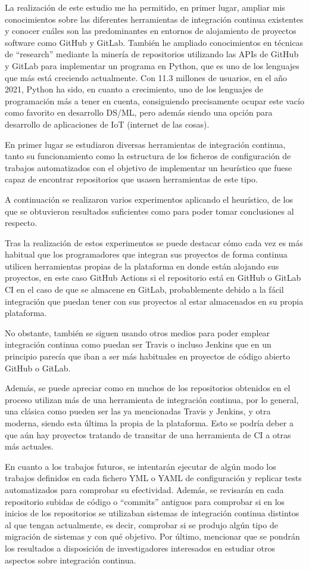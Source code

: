 La realización de este estudio me ha permitido, en primer lugar, ampliar mis conocimientos sobre las diferentes herramientas de integración continua existentes y conocer cuáles son las predominantes en entornos de alojamiento de proyectos software como GitHub y GitLab.
También he ampliado conocimientos en técnicas de ``research'' mediante la minería de repositorios utilizando las APIs de GitHub y GitLab para implementar un programa en Python, que es uno de los lenguajes que más está creciendo actualmente. 
Con 11.3 millones de usuarios, en el año 2021, Python ha sido, en cuanto a crecimiento, uno de los lenguajes de programación más a tener en cuenta, consiguiendo precisamente ocupar este vacío como favorito en desarrollo DS/ML, pero además siendo una opción para desarrollo de aplicaciones de IoT (internet de las cosas).

En primer lugar se estudiaron diversas herramientas de integración continua, tanto su funcionamiento como la estructura de los ficheros de configuración de trabajos automatizados con el objetivo de implementar un heurístico que fuese capaz de encontrar repositorios que usasen herramientas de este tipo.

A continuación se realizaron varios experimentos aplicando el heurístico, de los que se obtuvieron resultados suficientes como para poder tomar conclusiones al respecto.

Tras la realización de estos experimentos se puede destacar cómo cada vez es más habitual que los programadores que integran sus proyectos de forma continua utilicen herramientas propias de la plataforma en donde están alojando sus proyectos, en este caso GitHub Actions si el repositorio está en GitHub o GitLab CI en el caso de que se almacene en GitLab, probablemente debido a la fácil integración que puedan tener con sus proyectos al estar almacenados en su propia plataforma.

No obstante, también se siguen usando otros medios para poder emplear integración continua como puedan ser Travis o incluso Jenkins que en un principio parecía que iban a ser más habituales en proyectos de código abierto GitHub o GitLab. 

Además, se puede apreciar como en muchos de los repositorios obtenidos en el proceso utilizan más de una herramienta de integración continua, por lo general, una clásica como pueden ser las ya mencionadas Travis y Jenkins, y otra moderna, siendo esta última la propia de la plataforma. Esto se podría deber a que aún hay proyectos tratando de transitar de una herramienta de CI a otras más actuales.

En cuanto a los trabajos futuros, se intentarán ejecutar de algún modo los trabajos definidos en cada fichero YML o YAML de configuración y replicar tests automatizados para comprobar su efectividad. Además, se revisarán en cada repositorio subidas de código o ``commits'' antiguos para comprobar si en los inicios de los repositorios se utilizaban sistemas de integración continua distintos al que tengan actualmente, es decir, comprobar si se produjo algún tipo de migración de sistemas y con qué objetivo. Por último, mencionar que se pondrán los resultados a disposición de investigadores interesados en estudiar otros aspectos sobre integración continua.
